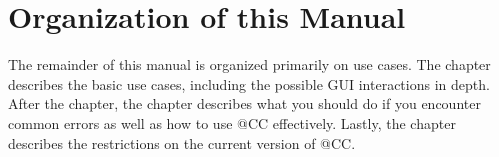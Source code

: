 \documentclass[main.tex]{subfiles}
\begin{document}
\section{Organization of this Manual}

The remainder of this manual is organized primarily on use cases. The  chapter describes the basic use cases, including the possible GUI interactions in depth. After the  chapter, the  chapter describes what you should do if you encounter common errors as well as how to use @CC effectively. Lastly, the  chapter describes the restrictions on the current version of @CC.
\end{document}
